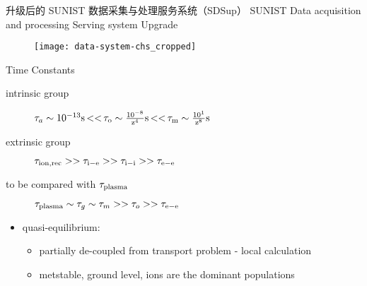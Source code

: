 \begin{frame}{升级后的 SUNIST 数据采集与处理服务系统（SDSup）}
  \centering
  \alert{S}UNIST \alert{D}ata acquisition and processing \alert{S}erving system \alert{Up}grade
  \begin{figure}
      \texttt{[image: data-system-chs\_cropped]}
  \end{figure}
\end{frame}

\begin{frame}{Time Constants}
	\begin{description}
		\item[intrinsic group]
			$\tau_a\sim 10^{-13}\rm{s}\,{<<}\,
				\tau_o\sim \frac{10^{-8}}{z^4}\rm{s}\,{<<}\,
				\tau_m\sim \frac{10^{1}}{z^8}\rm{s}$
		\item[extrinsic group]
			$\tau_{\rm{ion, rec}}>>\tau_{\rm{i-e}}>>\tau_{\rm{i-i}}>>\tau_{\rm{e-e}}$
		\item[to be compared with $\tau_{\rm{plasma}}$]
			$\tau_{\rm{plasma}}\sim\tau_{g}\sim\tau_{m}>>\tau_{o}>>\tau_{\rm{e-e}}$
	\end{description}
	\begin{itemize}
		\item quasi-equilibrium:
			\begin{itemize}
				\item partially de-coupled from transport problem - local calculation
				\item metstable, ground level, ions are the dominant populations
			\end{itemize}
	\end{itemize}
\end{frame}

